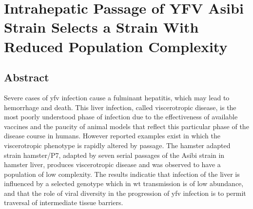 \chapter{Intrahepatic Passage of YFV Asibi Strain Selects a Strain With Reduced Population Complexity}

\section{Abstract}
Severe cases of \gls{yfv} infection cause a fulminant hepatitis, which may lead to hemorrhage and death. This liver infection, called viscerotropic disease, is the most poorly understood phase of infection due to the effectiveness of available vaccines and the paucity of animal models that reflect this particular phase of the disease course in humans. However reported examples exist in which the viscerotropic phenotype is rapidly altered by passage. The hamster adapted strain hamster/P7, adapted by seven serial passages of the Asibi strain in hamster liver, produces viscerotropic disease and was observed to have a population of low complexity. The results indicatie that infection of the liver is influenced by a selected genotype which in \gls{wt} transmission is of low abundance, and that the role of viral diversity in the progression of \gls{yfv} infection is to permit traversal of intermediate tissue barriers.
